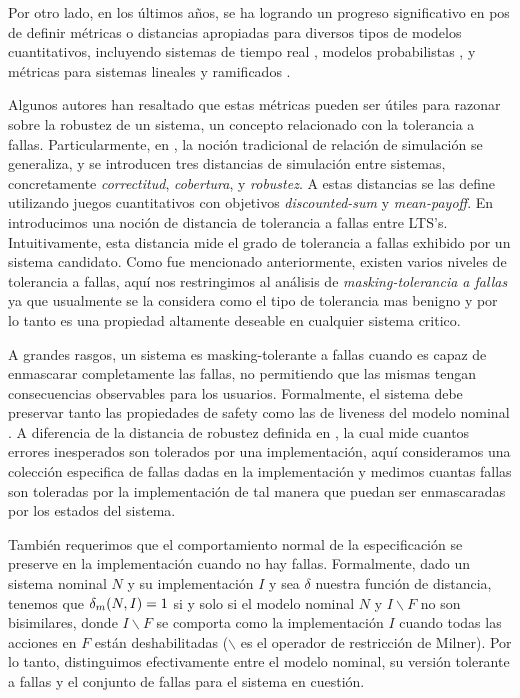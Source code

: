 Por otro lado, en los últimos años, se ha logrando un progreso significativo en pos de definir métricas o distancias apropiadas para diversos tipos de modelos cuantitativos, incluyendo sistemas de tiempo real \cite{HenzingerMP05}, modelos probabilistas \cite{DesharnaisGJP04}, y métricas para sistemas lineales y ramificados \cite{CernyHR12,AlfaroFS09,Henzinger13,LarsenFT11,ThraneFL10}. 

Algunos autores han resaltado que estas métricas pueden ser útiles para razonar sobre la robustez de un sistema, un concepto relacionado con la tolerancia a fallas. Particularmente, en \cite{CernyHR12}, la noción tradicional de relación de simulación se generaliza, y se introducen tres distancias de simulación entre sistemas, concretamente \emph{correctitud}, \emph{cobertura}, y \emph{robustez}.
A estas distancias se las define utilizando juegos cuantitativos con objetivos \emph{discounted-sum} y \emph{mean-payoff}.
En \cite{CastroDDP18b} introducimos una noción de distancia de tolerancia a fallas entre LTS's. Intuitivamente, esta distancia mide el grado de tolerancia a fallas exhibido por un sistema candidato. Como fue mencionado anteriormente, existen varios niveles de tolerancia a fallas, aquí nos restringimos al análisis de \emph{masking-tolerancia a fallas} ya que usualmente se la considera como el tipo de tolerancia mas benigno y por lo tanto es una propiedad altamente deseable en cualquier sistema critico.

A grandes rasgos, un sistema es masking-tolerante a fallas cuando es capaz de enmascarar completamente las fallas, no permitiendo que las mismas tengan consecuencias observables para los usuarios. Formalmente, el sistema debe preservar tanto las propiedades de safety como las de liveness del modelo nominal \cite{Gartner99}. A diferencia de la distancia de robustez definida en \cite{CernyHR12}, la cual mide cuantos errores inesperados son tolerados por una implementación, aquí consideramos una colección especifica de fallas dadas en la implementación y medimos cuantas fallas son toleradas por la implementación de tal manera que puedan ser enmascaradas por los estados del sistema.

También requerimos que el comportamiento normal de la especificación se preserve en la implementación cuando no hay fallas. %
Formalmente, dado un sistema nominal $N$ y su implementación $I$ y sea $\delta$ nuestra función de distancia, tenemos que $\delta_{m}(N,I)=1$ si y solo si el modelo nominal $N$ y $I\backslash F$ no son bisimilares, donde $I\backslash F$ se comporta como la implementación $I$ cuando todas las acciones en $F$ están deshabilitadas ($\backslash$ es el operador de restricción de  Milner).
Por lo tanto, distinguimos efectivamente entre el modelo nominal, su versión tolerante a fallas  y el conjunto de fallas para el sistema en cuestión.

